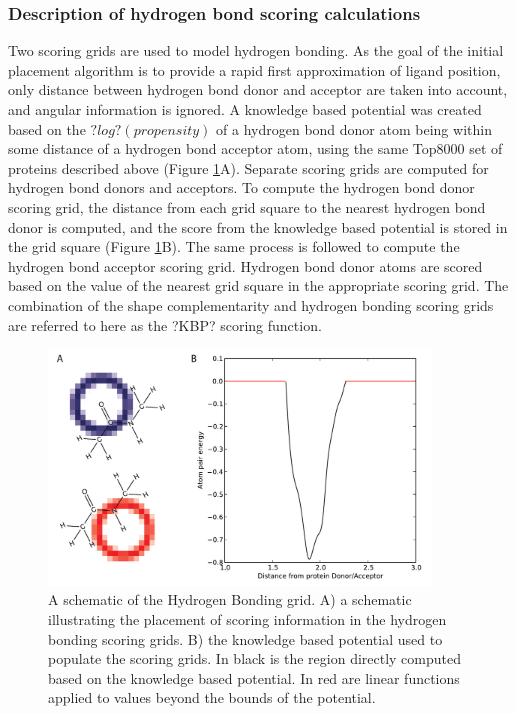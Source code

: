 \subsubsection{Description of hydrogen bond scoring calculations}

Two scoring grids are used to model hydrogen bonding.
As the goal of the initial placement algorithm is to provide a rapid first approximation of ligand position, only distance between hydrogen bond donor and acceptor are taken into account, and angular information is ignored.
A knowledge based potential was created based on the $?log?(propensity)$ of a hydrogen bond donor atom being within some distance of a hydrogen bond acceptor atom, using the same Top8000 set of proteins described above (Figure \ref{fig:hbond_schematic}A).
Separate scoring grids are computed for hydrogen bond donors and acceptors. To compute the hydrogen bond donor scoring grid, the distance from each grid square to the nearest hydrogen bond donor is computed, and the score from the knowledge based potential is stored in the grid square (Figure \ref{fig:hbond_schematic}B).
The same process is followed to compute the hydrogen bond acceptor scoring grid.
Hydrogen bond donor atoms are scored based on the value of the nearest grid square in the appropriate scoring grid.  
The combination of the shape complementarity and hydrogen bonding scoring grids are referred to here as the ?KBP? scoring function. 
\begin{figure}
\centering
\includegraphics[width=4in]{figures/lowres_appendix/Hydrogen_Bonding.pdf}
\caption{
A schematic of the Hydrogen Bonding grid.
A) a schematic illustrating the placement of scoring information in the hydrogen bonding scoring grids.
B) the knowledge based potential used to populate the scoring grids.
In black is the region directly computed based on the knowledge based potential.  In red are linear functions applied to values beyond the bounds of the potential.
}
\label{fig:hbond_schematic}
\end{figure}

